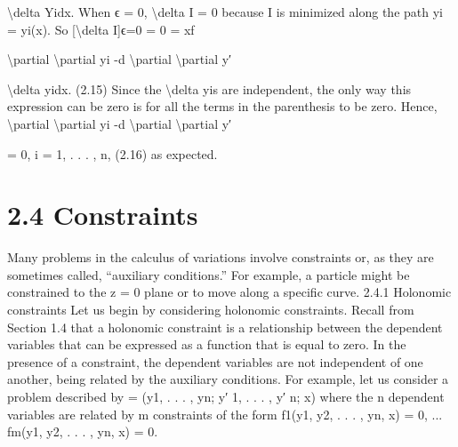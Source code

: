 \textbackslash{}delta Yidx.
When ϵ = 0, \textbackslash{}delta I = 0 because I is minimized along the path yi = yi(x). So
[\textbackslash{}delta I]ϵ=0 = 0 =
xf

\textbackslash{}partial
\textbackslash{}partial yi
-d
\textbackslash{}partial
\textbackslash{}partial y′

\textbackslash{}delta yidx.
(2.15)
Since the \textbackslash{}delta yis are independent, the only way this expression can be zero is for
all the terms in the parenthesis to be zero. Hence,
\textbackslash{}partial
\textbackslash{}partial yi
-d
\textbackslash{}partial
\textbackslash{}partial y′

= 0,
i = 1, . . . , n,
(2.16)
as expected.
\section*{2.4  Constraints}

Many problems in the calculus of variations involve constraints or, as they
are sometimes called, ``auxiliary conditions.'' For example, a particle might be
constrained to the z = 0 plane or to move along a specific curve.
2.4.1 Holonomic constraints
Let us begin by considering holonomic constraints. Recall from Section 1.4
that a holonomic constraint is a relationship between the dependent variables
that can be expressed as a function that is equal to zero. In the presence of a
constraint, the dependent variables are not independent of one another, being
related by the auxiliary conditions. For example, let us consider a problem
described by  = (y1, . . . , yn; y′
1, . . . , y′
n; x) where the n dependent variables are related by m constraints of the form
f1(y1, y2, . . . , yn, x) = 0,
...
fm(y1, y2, . . . , yn, x) = 0.

